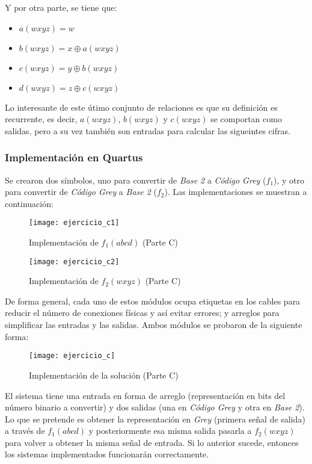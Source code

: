 \documentclass[../procedimientos.tex]{subfiles}
\begin{document}
Y por otra parte, se tiene que:
\begin{itemize}
  \item $a(wxyz) = w$
  \item $b(wxyz) = x \oplus a(wxyz)$
  \item $c(wxyz) = y \oplus b(wxyz)$
  \item $d(wxyz) = z \oplus c(wxyz)$
\end{itemize}

Lo interesante de este útimo conjunto de relaciones es que su definición es 
recurrente, es decir, $a(wxyz)$, $b(wxyz)$ y $c(wxyz)$ se comportan como 
salidas, pero a su vez también son entradas para calcular las sigueintes 
cifras.

\subsubsection{Implementación en Quartus}
Se crearon dos símbolos, uno para convertir de \textit{Base 2} a 
\textit{Código Grey} ($f_1$), y otro para convertir de \textit{Código Grey} a 
\textit{Base 2} ($f_2$). Las implementaciones se muestran a continuación:
\begin{figure}[H]
  \texttt{[image: ejercicio\_c1]}
  \caption{Implementación de $f_1(abcd)$ (Parte C)}
  \label{fig:c_f1}
\end{figure}
\begin{figure}[H]
  \texttt{[image: ejercicio\_c2]}
  \caption{Implementación de $f_2(wxyz)$ (Parte C)}
  \label{fig:c_f2}
\end{figure}

De forma general, cada uno de estos módulos ocupa etiquetas en los cables para 
reducir el número de conexiones físicas y así evitar errores; y arreglos para 
simplificar las entradas y las salidas. Ambos módulos se probaron de la 
siguiente forma:
\begin{figure}[H]
  \texttt{[image: ejercicio\_c]}
  \caption{Implementación de la solución (Parte C)}
  \label{fig:c_complete}
\end{figure}

El sistema tiene una entrada en forma de arreglo (representación en bits del 
número binario a convertir) y dos salidas (una en \textit{Código Grey} y otra 
en \textit{Base 2}). Lo que se pretende es obtener la representación en 
\textit{Grey} (primera señal de salida) a través de $f_1(abcd)$ y 
posteriormente esa misma salida pasarla a $f_2(wxyz)$ para volver a obtener la 
misma señal de entrada.  Si lo anterior sucede, entonces los sistemas 
implementados funcionarán correctamente.
\end{document}
